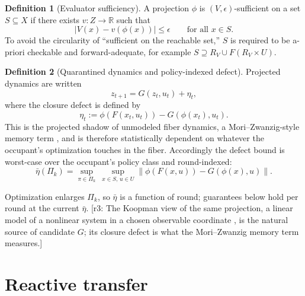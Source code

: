 \documentclass[11pt]{article}
\theoremstyle{definition}
\newtheorem{definition}{Definition}[section]
\theoremstyle{remark}
\newcommand{\RV}{R_V}
\newcommand{\etabar}{\bar{\eta}}
\newcommand{\revnote}[1]{\textcolor{red!60!black}{[r3: #1]}}
\begin{document}
\begin{definition}[Evaluator sufficiency]\label{def:suff}
A projection $\phi$ is $(V,\epsilon)$-sufficient on a set $S\subseteq X$ if there exists $v:Z\to\mathbb{R}$ such that
\begin{equation}
|V(x)-v(\phi(x))|\le\epsilon\qquad\text{for all }x\in S. \label{eq:suff}
\end{equation}
To avoid the circularity of ``sufficient on the reachable set,'' $S$ is required to be a-priori checkable and forward-adequate, for example $S\supseteq\RV\cup F(\RV\times U)$.
\end{definition}

\begin{definition}[Quarantined dynamics and policy-indexed defect]
Projected dynamics are written
\begin{equation}
z_{t+1}=G(z_t,u_t)+\eta_t, \label{eq:proj}
\end{equation}
where the closure defect is defined by
\begin{equation}
\eta_t:=\phi(F(x_t,u_t))-G(\phi(x_t),u_t). \label{eq:defect}
\end{equation}
This is the projected shadow of unmodeled fiber dynamics, a Mori--Zwanzig-style memory term \cite{zwanzig1961,mori1965,lin2021}, and is therefore statistically dependent on whatever the occupant's optimization touches in the fiber. Accordingly the defect bound is worst-case over the occupant's policy class and round-indexed:
\begin{equation}
\etabar(\Pi_k)=\sup_{\pi\in\Pi_k}\ \sup_{x\in S,\,u\in U}\|\phi(F(x,u))-G(\phi(x),u)\|. \label{eq:etabar}
\end{equation}
\end{definition}
Optimization enlarges $\Pi_k$, so $\etabar$ is a function of round; guarantees below hold per round at the current $\etabar$. \revnote{The Koopman view of the same projection, a linear model of a nonlinear system in a chosen observable coordinate \cite{koopman1931,mezic2005,brunton2022}, is the natural source of candidate $G$; its closure defect is what the Mori--Zwanzig memory term measures.}

\section{Reactive transfer}\label{sec:transfer}
\end{document}
